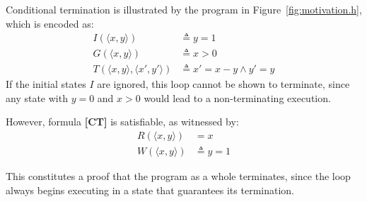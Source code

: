 \documentclass[preprint]{sigplanconf}
\theoremstyle{definition}
\begin{document}
Conditional termination is illustrated by the program in Figure~\ref{fig:motivation.h},
which is encoded as:
\begin{align*}
            I(\langle x, y \rangle) & \triangleq y = 1 \\
            G(\langle x, y \rangle) & \triangleq x > 0 \\
            T(\langle x, y \rangle, \langle x', y' \rangle) & \triangleq x' = x - y \wedge y' = y 
\end{align*}
If the initial states $I$ are ignored, this loop cannot be shown to terminate, since any state with $y = 0$ and $x > 0$
would lead to a non-terminating execution.

However, formula {\bf [CT]} is satisfiable, as witnessed by:
\begin{align*}
R(\langle x,y\rangle) & = x\\
W(\langle x, y \rangle ) & \triangleq y  = 1
\end{align*}


This constitutes a proof that the program as a whole terminates, since the loop always begins
executing in a state that guarantees its termination.\\





\end{document}
